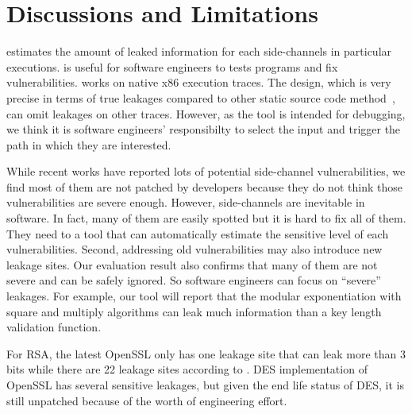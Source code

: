 \section{Discussions and Limitations}
\tool{} estimates the amount of leaked information for each side-channels
in particular executions. \tool{} is useful for software
engineers to tests programs and fix vulnerabilities.
\tool{} works on native x86 execution traces. The design, which is very
precise in terms of true leakages compared to other static source code
method~\cite{197207,BacelarAlmeida:2013:FVS:2483313.2483334}, can omit
leakages on other traces. However, as the tool is intended for debugging,
we think it is software engineers' responsibilty to select the input and trigger the 
path in which they are interested.

While recent works have reported lots
of potential side-channel vulnerabilities, we find most of them are not patched by
developers because they do not think those vulnerabilities are severe enough.
However, side-channels are inevitable in software. In fact, many of them
are easily spotted but it is hard to fix all of them. They need to a
tool that can automatically estimate the sensitive level of each vulnerabilities.
Second, addressing old vulnerabilities may also introduce new leakage
sites. Our evaluation result also confirms that many of them are not 
severe and can be safely ignored. So software engineers can focus on
``severe'' leakages. For example, our tool will report that 
the modular exponentiation with square and multiply algorithms can
leak much information than a key length validation function.


For RSA, the latest
OpenSSL only has one leakage site that can leak more than 3 bits while there
are 22 leakage sites according to \tool{}. DES implementation of OpenSSL has
several sensitive leakages, but given the end life status of DES, it is still
unpatched because of the worth of engineering effort. 
%

